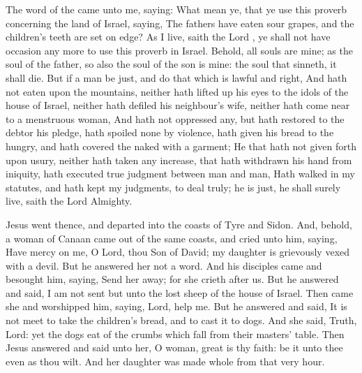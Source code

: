 
\vspace{-0.1\baselineskip}

 The word of the  came unto me, saying: What mean ye, that ye use this proverb concerning the land of Israel, saying, The fathers have eaten sour grapes, and the children's teeth are set on edge? As I live, saith the Lord , ye shall not have occasion any more to use this proverb in Israel. Behold, all souls are mine; as the soul of the father, so also the soul of the son is mine: the soul that sinneth, it shall die. But if a man be just, and do that which is lawful and right, And hath not eaten upon the mountains, neither hath lifted up his eyes to the idols of the house of Israel, neither hath defiled his neighbour's wife, neither hath come near to a menstruous woman, And hath not oppressed any, but hath restored to the debtor his pledge, hath spoiled none by violence, hath given his bread to the hungry, and hath covered the naked with a garment; He that hath not given forth upon usury, neither hath taken any increase, that hath withdrawn his hand from iniquity, hath executed true judgment between man and man, Hath walked in my statutes, and hath kept my judgments, to deal truly; he is just, he shall surely live, saith the Lord Almighty.


 Jesus went thence, and departed into the coasts of Tyre and Sidon. And, behold, a woman of Canaan came out of the same coasts, and cried unto him, saying, Have mercy on me, O Lord, thou Son of David; my daughter is grievously vexed with a devil. But he answered her not a word. And his disciples came and besought him, saying, Send her away; for she crieth after us. But he answered and said, I am not sent but unto the lost sheep of the house of Israel. Then came she and worshipped him, saying, Lord, help me. But he answered and said, It is not meet to take the children's bread, and to cast it to dogs. And she said, Truth, Lord: yet the dogs eat of the crumbs which fall from their masters' table. Then Jesus answered and said unto her, O woman, great is thy faith: be it unto thee even as thou wilt. And her daughter was made whole from that very hour.

